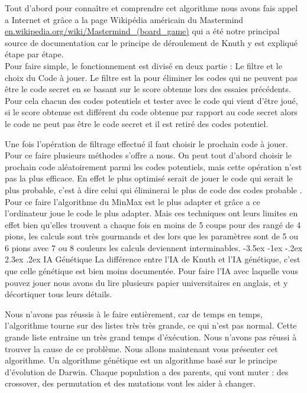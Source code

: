 \documentclass[11pt, a4paper]{article}
\makeatletter
\renewcommand{\subsection}{\@startsection{subsection}{1}{\z@}%
          {-3.5ex \@plus -1ex \@minus -.2ex}%
          {2.3ex \@plus .2ex}%
          {\reset@font\large\bfseries}}
\makeatother
\begin{document}
 \vspace{3  mm}


Tout d’abord pour connaître et comprendre cet algorithme nous avons fais appel a Internet et grâce a 
la page Wikipédia américain du Mastermind \url{en.wikipedia.org/wiki/Mastermind_(board_game)} qui a été notre principal source de documentation car le principe de 
déroulement de Knuth y est expliqué étape par étape.\\
Pour faire simple, le fonctionnement est divisé en deux partie : Le filtre et le choix du Code à jouer. 
Le filtre est la pour éliminer les codes qui ne peuvent pas être le code secret en se basant sur le score obtenue lors des essaies précédents. 
Pour cela chacun des codes potentiels et tester avec le code qui vient d’être joué,
si le score obtenue est différent du code obtenue par rapport au code secret alors le code ne peut pas être le code secret et il est retiré des codes potentiel.

\vspace{3  mm}

Une fois l’opération de filtrage effectué il faut choisir le prochain code à jouer. Pour ce faire plusieurs méthodes s’offre a nous. 
On peut tout d’abord choisir le prochain code aléatoirement parmi les codes potentiels, mais cette opération n’est pas la plus efficace. 
En effet le plus optimisé serait de jouer le code qui serait le plus probable, c’est à dire celui qui éliminerai le plus de code des codes probable .
 Pour ce faire l’algorithme du MinMax est le plus adapter et grâce a ce l’ordinateur joue le code le plus adapter. \vspace{3  mm}
Mais ces techniques ont leurs limites en effet bien qu’elles trouvent a chaque fois en moins de 5 coups pour des rangé de 4 pions, 
les calculs sont très gourmands et des lors que les paramètres sont de 5 ou 6 pions avec 7 ou 8 couleurs les calculs deviennent interminables.
\subsection{IA Génétique}
La différence entre l'IA de Knuth et l'IA génétique, c'est que celle génétique est bien moins documentée. 
Pour faire l'IA avec laquelle vous pouvez jouer nous avons du lire plusieurs papier universitaires en anglais, et y décortiquer tous leurs détails.

\vspace{3  mm}


Nous n'avons pas réussis à le faire entièrement, car de temps en temps, l'algorithme tourne sur des listes très très grande, ce qui n'est pas normal.
 Cette grande liste entraine un très grand temps d'éxécution. Nous n'avons pas réussi à trouver la cause de ce problème.
Nous allons maintenant vous présenter cet algorithme.
Un algorithme génétique est un algorithme basé sur le principe d'évolution de Darwin. Chaque population a des parents, qui vont muter : des crossover, 
des permutation et des mutations vont les aider à changer.
\end{document}
